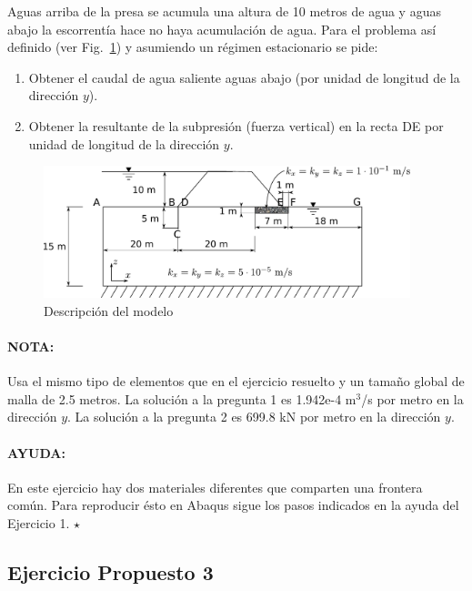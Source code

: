 Aguas arriba de la presa se acumula una altura de 10 metros de agua y
aguas abajo la escorrentía hace no haya acumulación de agua. Para el
problema así definido (ver Fig.~\ref{enu03}) y asumiendo un régimen
estacionario se pide:
\begin{enumerate}
\item Obtener el caudal de agua saliente aguas abajo (por unidad de
  longitud de la dirección $y$).
\item Obtener la resultante de la subpresión (fuerza vertical) en la
  recta DE por unidad de longitud de la dirección $y$.
\end{enumerate}



\begin{figure}[!h]
  \begin{center}
    \includegraphics[width=0.95\textwidth]{./body/images/enu03}
  \end{center}
  \caption{Descripción del modelo}
  \label{enu03}
\end{figure}

\paragraph{NOTA:} Usa el mismo tipo de elementos que en el ejercicio
resuelto y un tamaño global de malla de 2.5 metros. La solución a la
pregunta 1 es 1.942e-4 m$^3$/s por metro en la dirección $y$. La
solución a la pregunta 2 es 699.8 kN por metro en la dirección $y$.

\paragraph{AYUDA:} En este ejercicio hay dos materiales diferentes que
comparten una frontera común. Para reproducir ésto en Abaqus sigue los
pasos indicados en la ayuda del Ejercicio 1.
\hspace{20mm}\hrulefill$\star$\hrulefill\hspace{20mm}

\clearpage \newpage
\subsection{Ejercicio Propuesto 3}


